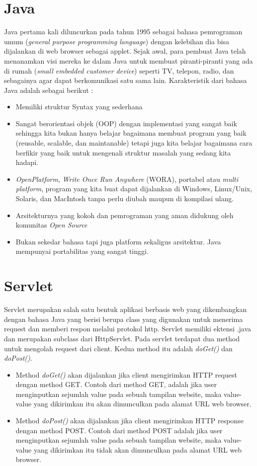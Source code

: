 \newpage
\section{Java}
Java pertama kali diluncurkan pada tahun 1995 sebagai bahasa pemrograman umum (\textit{general purpose programming language}) dengan kelebihan dia bisa dijalankan di web browser sebagai applet. Sejak awal, para pembuat Java telah menanamkan visi mereka ke dalam Java untuk membuat piranti-piranti yang ada di rumah (\textit{small embedded customer device}) seperti TV, telepon, radio, dan sebagainya agar dapat berkomunikasi satu sama lain. Karakteristik dari bahasa Java adalah sebagai berikut : \citep{Utama}
\begin{itemize}
	\itemsep0em
	\item Memiliki struktur Syntax yang sederhana
	\item Sangat berorientasi objek (OOP) dengan implementasi yang sangat baik sehingga
	kita bukan hanya belajar bagaimana membuat program yang baik (reusable,
	scalable, dan maintanable) tetapi juga kita belajar bagaimana cara berfikir yang
	baik untuk mengenali struktur masalah yang sedang kita hadapi.
	\item \textit{OpenPlatform}, \textit{Write Once Run Anywhere} (WORA), portabel atau \textit{multi platform}, program yang kita buat dapat dijalankan di Windows, Linux/Unix, Solaris, dan MacIntosh tanpa perlu diubah maupun di kompilasi ulang.
	\item Arsitekturnya yang kokoh dan pemrograman yang aman didukung oleh komunitas
	\textit{Open Source}
	\item Bukan sekedar bahasa tapi juga platform sekaligus arsitektur. Java mempunyai portabilitas yang sangat tinggi.
\end{itemize}

\section{Servlet}
Servlet merupakan salah satu bentuk aplikasi berbasis web yang dikembangkan dengan bahasa Java yang berisi berupa class yang digunakan untuk menerima request dan memberi respon melalui protokol http. Servlet memiliki ektensi .java dan merupakan subclass dari HttpServlet. Pada servlet terdapat dua method untuk mengolah request dari client. Kedua method itu adalah \textit{doGet()} dan \textit{doPost()}. \citep{senasama}
\begin{itemize}
	\itemsep0em
	\item Method \textit{doGet()} akan dijalankan jika client mengirimkan HTTP request dengan method GET. Contoh dari method GET, adalah jika user menginputkan sejumlah value pada sebuah tampilan website, maka value-value yang dikirimkan itu akan dimunculkan pada alamat URL web browser.
	\item Method \textit{doPost()} akan dijalankan jika client mengirimkan HTTP response dengan method POST. Contoh dari method POST adalah jika user menginputkan sejumlah value pada sebuah tampilan website, maka value-value yang dikirimkan itu tidak akan dimunculkan pada alamat URL web browser.
\end{itemize}

